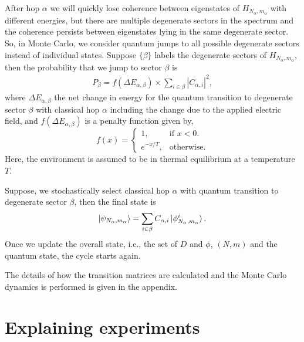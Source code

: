 \documentclass[a4paper,twocolumn]{revtex4-1} %
\begin{document}
After hop $\alpha$ we will quickly lose coherence between eigenstates 
of $H_{N_{\alpha},m_{\alpha}}$ with different 
energies, but
there are multiple degenerate sectors in the spectrum 
and 
 the coherence persists between
 eigenstates lying in the same degenerate sector.
So, in Monte Carlo, we consider quantum jumps to all possible degenerate sectors
instead of individual states.
Suppose $\{\beta\}$ labels the degenerate sectors
of $H_{N_{\alpha},m_{\alpha}}$, then
the probability that we jump to sector $\beta$
is
\begin{gather}
P_\beta = f(\Delta E_{\alpha,\beta}) \times \sum_{i\in\beta} |C_{\alpha,i}|^2,
\end{gather}
where 
$\Delta E_{\alpha,\beta}$ the net change in energy
for the quantum transition to degenerate sector $\beta$ with classical hop $\alpha$
 including the change due to the applied electric field,
 and 
 $f(\Delta E_{\alpha,\beta})$ is a penalty function given by,
\begin{equation}
\nonumber
  f(x)=\begin{cases}
    1, & \text{if $x<0$}.\\
    e^{-x/{T}}, & \text{otherwise}.
  \end{cases}
\end{equation}
Here, the environment is assumed to be in thermal equilibrium at
a temperature $T$.

Suppose, we stochastically select 
classical hop $\alpha$ with quantum transition to degenerate sector $\beta$,
 then
the final state is
\begin{gather}
\ket{\psi_{N_{\alpha},m_{\alpha}}}= \sum_{i\in\beta} C_{\alpha,i} \ket{\phi_{N_{\alpha},m_{\alpha}}^i}.
\end{gather}
Once we update the overall state, i.e., the set of $D$ and $\phi$, $(N,m)$ and the quantum state, the cycle starts again.

The details of how the transition matrices are calculated and the Monte Carlo dynamics is performed
is given in the appendix. 



\section{Explaining experiments}
\end{document}
